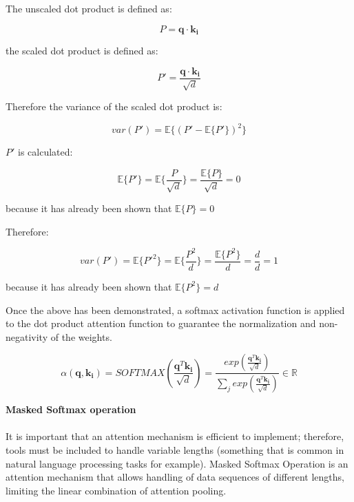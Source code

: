 \newline

The unscaled dot product is defined as:

\begin{equation}
    P=\mathbf{q} \cdot{} \mathbf{k_i}
\end{equation}

the scaled dot product is defined as:

\begin{equation}
    P'=\frac{\mathbf{q} \cdot{} \mathbf{k_i}}{\sqrt{d}}
\end{equation}

Therefore the variance of the scaled dot product is:

\begin{equation}
    var(P')=\mathbb{E}\{(P'-\mathbb{E}\{P'\})^2\}
\end{equation}

$P'$ is calculated:

\begin{equation}
    \mathbb{E}\{P'\}=\mathbb{E}\{\frac{P}{\sqrt{d}}\}=\frac{\mathbb{E}\{P\}}{\sqrt{d}}=0
\end{equation}

because it has already been shown that $\mathbb{E}\{P\}=0$

Therefore:

\begin{equation}
    var(P')=\mathbb{E}\{P'^2\}=\mathbb{E}\{\frac{P^2}{d}\}=\frac{\mathbb{E}\{P^2\}}{d}=\frac{d}{d}=1
\end{equation}

because it has already been shown that $\mathbb{E}\{P^2\}=d$

Once the above has been demonstrated, a softmax activation function is applied to the dot product attention function to guarantee the normalization and non-negativity of the weights.

\begin{equation}
    \alpha (\mathbf{q},\mathbf{k_{i}})=SOFTMAX(\frac{\mathbf{q}^{T}\mathbf{k_{i}}}{\sqrt{d}})=\frac{exp(\frac{\mathbf{q}^{T}\mathbf{k_{i}}}{\sqrt{d}})}{\sum_{j} exp(\frac{\mathbf{q}^{T}\mathbf{k_{i}}}{\sqrt{d}})} \in \mathbb{R}
\end{equation}

\textbf{Masked Softmax operation}
\\\\
It is important that an attention mechanism is efficient to implement; therefore, tools must be included to handle variable lengths (something that is common in natural language processing tasks for example). Masked Softmax Operation is an attention mechanism that allows handling of data sequences of different lengths, limiting the linear combination of attention pooling.


